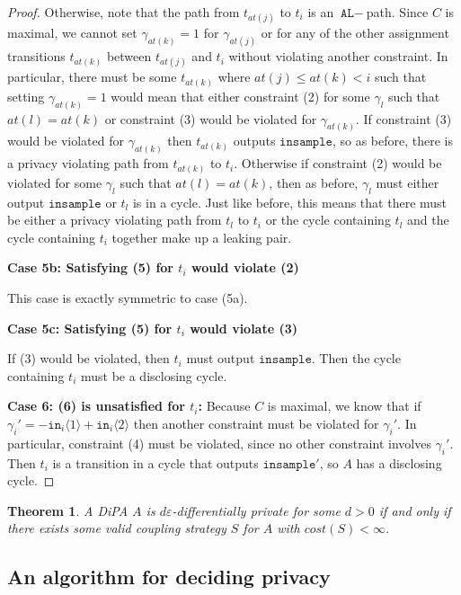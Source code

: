 \documentclass[12pt]{article}
\newcommand{\brangle}[1]{\langle #1 \rangle}
\newtheorem{thm}{Theorem}[section]
\theoremstyle{definition}
\begin{document}
\begin{proof}
    Otherwise, note that the path from $t_{at(j)}$ to $t_i$ is an $\texttt{AL}-$path. Since $C$ is maximal, we cannot set $\gamma_{at(k)}=1$ for $\gamma_{at(j)}$ or for any of the other assignment transitions $t_{at(k)}$ between $t_{at(j)}$ and $t_i$ without violating another constraint. 
    In particular, there must be some $t_{at(k)}$ where $at(j)\leq at(k)<i$ such that setting $\gamma_{at(k)} = 1$ would mean that either constraint (2) for some $\gamma_l$ such that $at(l) = at(k)$ or constraint (3) would be violated for $\gamma_{at(k)}$. 
    If constraint (3) would be violated for $\gamma_{at(k)}$ then $t_{at(k)}$ outputs $\texttt{insample}$, so as before, there is a privacy violating path from $t_{at(k)}$ to $t_i$. Otherwise if constraint (2) would be violated for some $\gamma_l$ such that $at(l) = at(k)$, then as before, $\gamma_l$ must either output $\texttt{insample}$ or $t_l$ is in a cycle. 
    Just like before, this means that there must be either a privacy violating path from $t_l$ to $t_i$ or the cycle containing $t_l$ and the cycle containing $t_i$ together make up a leaking pair. 

    \textbf{Case 5b: Satisfying (5) for $t_i$ would violate (2)}

    This case is exactly symmetric to case (5a).

    \textbf{Case 5c: Satisfying (5) for $t_i$ would violate (3)}

    If (3) would be violated, then $t_i$ must output $\texttt{insample}$. Then the cycle containing $t_i$ must be a disclosing cycle. 
    
    \textbf{Case 6: (6) is unsatisfied for $t_i$:} Because $C$ is maximal, we know that if $\gamma_i' = -\texttt{in}_i\brangle{1}+\texttt{in}_i\brangle{2}$ then another constraint must be violated for $\gamma_i'$. In particular, constraint (4) must be violated, since no other constraint involves $\gamma_i'$. 
    Then $t_i$ is a transition in a cycle that outputs $\texttt{insample}'$, so $A$ has a disclosing cycle.
\end{proof}


\begin{thm}
    A DiPA $A$ is $d\varepsilon$-differentially private for some $d>0$ if and only if there exists some valid coupling strategy $S$ for $A$ with $cost(S)<\infty$. 
\end{thm}

\subsection{An algorithm for deciding privacy}
\end{document}
